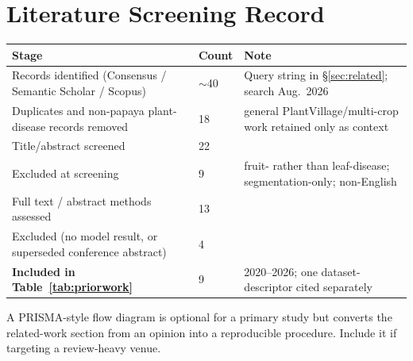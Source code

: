 \documentclass[10pt,twocolumn,a4paper]{article}
\begin{document}
\section{Literature Screening Record}
\label{app:screen}
\vspace{-2pt}
{\footnotesize
\begin{tabularx}{\textwidth}{@{}p{5.5cm} p{2.0cm} X@{}}
\toprule
\rowcolor{hdrgray}
Stage & Count & Note \\
\midrule
Records identified (Consensus / Semantic Scholar / Scopus) & $\sim$40 & Query string in \S\ref{sec:related}; search Aug.\ 2026 \\
Duplicates and non-papaya plant-disease records removed & 18 & general PlantVillage/multi-crop work retained only as context \\
Title/abstract screened & 22 & \\
Excluded at screening & 9 & fruit- rather than leaf-disease; segmentation-only; non-English \\
Full text / abstract methods assessed & 13 & \\
Excluded (no model result, or superseded conference abstract) & 4 & \\
\textbf{Included in Table~\ref{tab:priorwork}} & 9 & 2020--2026; one dataset-descriptor cited separately \cite{bdpapaya2024} \\
\bottomrule
\end{tabularx}
\vspace{4pt}

\noindent A PRISMA-style flow diagram is optional for a primary study but converts the related-work section from an opinion into a reproducible procedure. Include it if targeting a review-heavy venue.}
\end{document}

